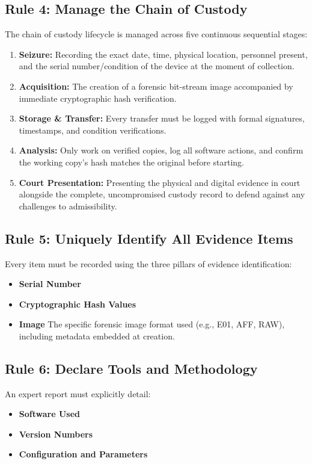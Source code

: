 \subsection{Rule 4: Manage the Chain of Custody}
The chain of custody lifecycle is managed across five continuous sequential stages:
\begin{enumerate}
    \item \textbf{Seizure:} Recording the exact date, time, physical location, personnel present, and the serial number/condition of the device at the moment of collection.
    \item \textbf{Acquisition:} The creation of a forensic bit-stream image accompanied by immediate cryptographic hash verification.
    \item \textbf{Storage \& Transfer:}  Every transfer must be logged with formal signatures, timestamps, and condition verifications.
    \item \textbf{Analysis:} Only work on verified copies, log all software actions, and confirm the working copy's hash matches the original before starting.
    \item \textbf{Court Presentation:} Presenting the physical and digital evidence in court alongside the complete, uncompromised custody record to defend against any challenges to admissibility.
\end{enumerate}

\subsection{Rule 5: Uniquely Identify All Evidence Items}
Every item must be recorded using the three pillars of evidence identification:
\begin{itemize}
    \item \textbf{Serial Number} 
    \item \textbf{Cryptographic Hash Values} 
    \item \textbf{Image} The specific forensic image format used (e.g., E01, AFF, RAW), including metadata embedded at creation.
\end{itemize}

\subsection{Rule 6: Declare Tools and Methodology}

An expert report must explicitly detail:
\begin{itemize}
    \item \textbf{Software Used} 
    \item \textbf{Version Numbers} 
    \item \textbf{Configuration and Parameters} 
\end{itemize}


